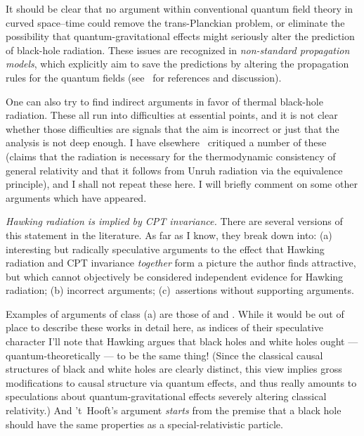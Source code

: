 \documentclass[12pt]{article}
\begin{document}
It should be clear that no argument within conventional quantum field theory in curved space--time could remove the trans-Planckian problem, or eliminate the possibility that quantum-gravitational effects might seriously alter the prediction of black-hole radiation.  These issues are recognized in {\em non-standard propagation models}, which explicitly aim to save the predictions by altering the propagation rules for the quantum fields (see~\citep{Helfer:2003va} for references and discussion).

One can also try to find indirect arguments in favor of thermal black-hole radiation.  These all run into difficulties at essential points, and it is not clear whether those difficulties are signals that the aim is incorrect or just that the analysis is not deep enough.
I have elsewhere~\citep{Helfer:2003va} critiqued a number of these (claims that the radiation is necessary for the thermodynamic consistency of general relativity and that it follows from Unruh radiation via the equivalence principle), and I shall not repeat these here.  I will briefly comment on some other arguments which have appeared.


{\em Hawking radiation is implied by CPT invariance.}  
There are several versions of this statement in the literature.  As far as I know, they break down into:  (a) interesting but radically speculative arguments to the effect that Hawking radiation and CPT invariance {\em together} form a picture the author finds attractive, but which cannot objectively be considered independent evidence for Hawking radiation; (b) incorrect arguments; (c)~assertions without supporting arguments.  

Examples of arguments of class (a) are those of \citet{Hawking:1976de} and \citet{Hooft:1996tq}.  
While it would be out of place to describe these works in detail here, as indices of their speculative character I'll note that Hawking argues that black holes and white holes ought --- quantum-theoretically --- to be the same thing!  (Since the classical causal structures of black and white holes are clearly distinct, this view implies gross modifications to causal structure via quantum effects, and thus really amounts to speculations about quantum-gravitational effects severely altering classical relativity.)  And 't~Hooft's argument {\em starts} from the premise that a black hole should have the same properties as a special-relativistic particle.
\end{document}
